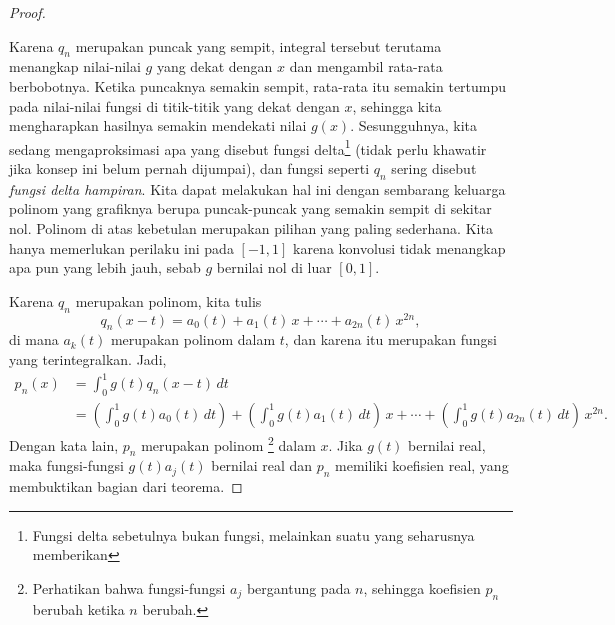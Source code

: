 \begin{proof}
\begin{myfigureht}
\caption{Untuk $x=0.3$, grafik $q_{100}(x-t)$ (puncak abu-abu muda yang berpusat
di $x$), suatu fungsi kontinu
$g(t)$ (garis bergerigi), dan hasil kali $g(t)q_{100}(x-t)$ (garis tebal).\label{fig:approxdeltaconv}}
\end{myfigureht}

Karena $q_n$ merupakan puncak yang sempit, integral tersebut
terutama menangkap nilai-nilai $g$ yang
dekat dengan $x$ dan mengambil rata-rata berbobotnya.
Ketika puncaknya semakin sempit, rata-rata itu semakin tertumpu pada nilai-nilai
fungsi di titik-titik yang dekat dengan $x$, sehingga kita mengharapkan hasilnya
semakin mendekati nilai $g(x)$.  Sesungguhnya,
kita sedang mengaproksimasi apa yang disebut fungsi delta\footnote{Fungsi delta
sebetulnya bukan fungsi,
melainkan suatu  yang seharusnya memberikan
}
(tidak perlu khawatir jika konsep ini belum pernah dijumpai),
dan fungsi seperti $q_n$ sering disebut
\emph{fungsi delta hampiran}.
Kita dapat melakukan hal ini dengan sembarang keluarga polinom yang grafiknya
berupa puncak-puncak yang semakin sempit di sekitar nol.  Polinom di atas kebetulan merupakan
pilihan yang paling sederhana.
Kita hanya memerlukan perilaku ini pada $[-1,1]$ karena konvolusi tidak menangkap
apa pun yang lebih jauh, sebab $g$ bernilai nol di luar $[0,1]$.

Karena $q_n$ merupakan polinom, kita tulis
\begin{equation*}
q_n(x-t) = a_0(t) + a_1(t)\,x + \cdots + a_{2n}(t)\, x^{2n} ,
\end{equation*}
di mana $a_k(t)$ merupakan polinom dalam $t$, dan karena itu
merupakan fungsi yang terintegralkan.
Jadi,
\begin{equation*}
\begin{split}
p_n(x) & =
\int_{0}^1 g(t)q_n(x-t) \,dt
\\
&=
\left(
\int_0^1
g(t)
a_0(t)\,dt
\right)
+
\left(
\int_0^1
g(t)
a_1(t)\,dt
\right)
\,
x
+
\cdots
+
\left(
\int_0^1
g(t)
a_{2n}(t)\,dt
\right)
\,
x^{2n} .
\end{split}
\end{equation*}
Dengan kata lain, $p_n$ merupakan polinom%
\footnote{%
Perhatikan bahwa fungsi-fungsi $a_j$ bergantung pada $n$, sehingga koefisien $p_n$
berubah ketika $n$ berubah.}
 dalam $x$.
Jika $g(t)$ bernilai real, maka fungsi-fungsi $g(t)a_j(t)$
bernilai real dan $p_n$ memiliki koefisien real,
yang membuktikan bagian  dari teorema.


\end{proof}
